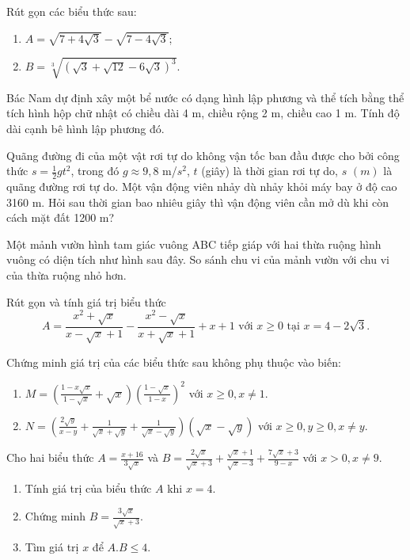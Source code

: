 \documentclass[%
    fontsize=12pt,%
    chapterprefix=false,%
    open=right,%
    twoside=false,%
    numbers=noenddot,%
    headings=optiontohead,%
    final,%
    DIV=15,%
    parskip=half %
]{scrbook}
\begin{document}
\begin{tuluan}
\item Rút gọn các biểu thức sau:
\begin{enumerate}[label=\alph*)]
  \item[a)] $A = \sqrt{7 + 4\sqrt{3}} - \sqrt{7 - 4\sqrt{3}}$;
  \item[b)] $B = \sqrt[3]{(\sqrt{3} + \sqrt{12} - 6\sqrt{3})^3}$.
\end{enumerate}

\item Bác Nam dự định xây một bể nước có dạng hình lập phương và thể tích bằng thể tích hình hộp chữ nhật có chiều dài 4 m, chiều rộng 2 m, chiều cao 1 m. Tính độ dài cạnh bê hình lập phương đó.

\item Quãng đường đi của một vật rơi tự do không vận tốc ban đầu được cho bởi công thức $s = \frac{1}{2}gt^2$, trong đó $g \approx 9,8$ m/$s^2$, $t$ (giây) là thời gian rơi tự do, $s$ $(m)$ là quãng đường rơi tự do. Một vận động viên nhảy dù nhảy khỏi máy bay ở độ cao 3160 m. Hỏi sau thời gian bao nhiêu giây thì vận động viên cần mở dù khi còn cách mặt đất 1200 m?

\item Một mảnh vườn hình tam giác vuông ABC tiếp giáp với hai thừa ruộng hình vuông có diện tích như hình sau đây. So sánh chu vi của mảnh vườn với chu vi của thừa ruộng nhỏ hơn.

\item Rút gọn và tính giá trị biểu thức \[ A = \frac{x^2 + \sqrt{x}}{x - \sqrt{x} + 1} - \frac{x^2 - \sqrt{x}}{x + \sqrt{x} + 1} + x + 1 \text{ với } x \geq 0 \text{ tại } x = 4 - 2\sqrt{3}. \]

\item Chứng minh giá trị của các biểu thức sau không phụ thuộc vào biến:
\begin{enumerate}[label=\alph*)]
  \item[a)] $ M = \left( \frac{1 - x\sqrt{x}}{1 - \sqrt{x}} + \sqrt{x} \right) \left( \frac{1 - \sqrt{x}}{1 - x} \right)^2 $ với $ x \geq 0, x \neq 1 $.
  \item[b)] $ N = \left( \frac{2\sqrt{y}}{x - y} + \frac{1}{\sqrt{x} + \sqrt{y}} + \frac{1}{\sqrt{x} - \sqrt{y}} \right) (\sqrt{x} - \sqrt{y}) $ với $ x \geq 0, y \geq 0, x \neq y $.
\end{enumerate}

\item Cho hai biểu thức $ A = \frac{x + 16}{3\sqrt{x}} $ và $ B = \frac{2\sqrt{x}}{\sqrt{x} + 3} + \frac{\sqrt{x} + 1}{\sqrt{x} - 3} + \frac{7\sqrt{x} + 3}{9 - x} $ với $ x > 0, x \neq 9 $.
\begin{enumerate}[label=\alph*)]
  \item[a)] Tính giá trị của biểu thức $ A $ khi $ x = 4 $.
  \item[b)] Chứng minh $ B = \frac{3\sqrt{x}}{\sqrt{x} + 3} $.
  \item[c)] Tìm giá trị $ x $ để $ A.B \leq 4 $.
\end{enumerate}


\end{tuluan}
\end{document}

